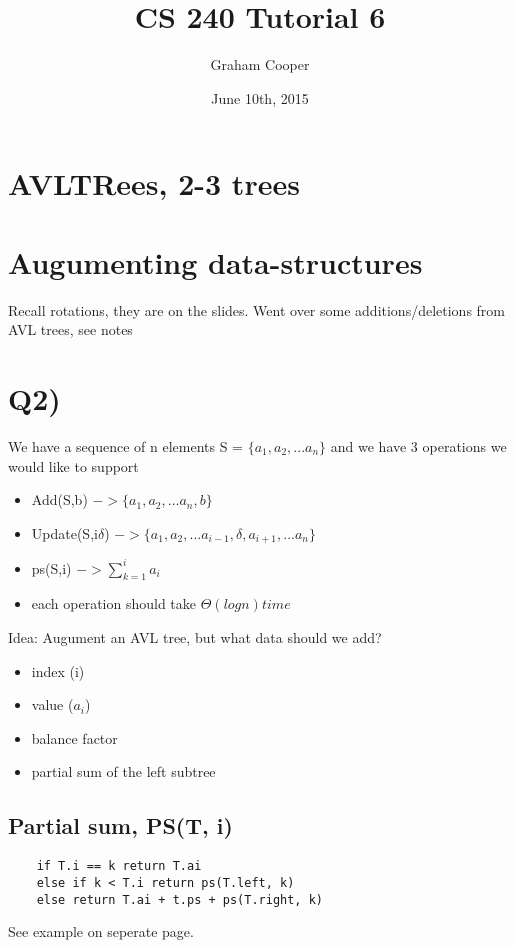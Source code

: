 \documentclass[12pt]{article}
\title{\vspace{-15ex}CS 240 Tutorial 6\vspace{-1ex}}
\date{June 10th, 2015}
\author{Graham Cooper}
\begin{document}
	\maketitle
	\section*{AVLTRees, 2-3 trees}
	\section*{Augumenting data-structures}
	
	Recall rotations, they are on the slides. Went over some additions/deletions from AVL trees, see notes\\
	
	\section*{Q2)}
	We have a sequence of n elements S = $\{a_1, a_2, ... a_n\}$ and we have 3 operations we would like to support\\
	\begin{itemize}
		\item Add(S,b) $-> \{a_1, a_2, ...a_n, b\}$
		\item Update(S,i$\delta$) $-> \{a_1, a_2, ... a_{i-1}, \delta, a_{i+1}, ... a_n\}$
		\item ps(S,i) $-> \sum_{k=1}^{i}a_i$
		\item each operation should take $\Theta(logn) time$
	\end{itemize}
	
	Idea: Augument an AVL tree, but what data should we add?
	\begin{itemize}
		\item index (i)
		\item value ($a_i$)
		\item balance factor
		\item partial sum of the left subtree
	\end{itemize}
	
	\subsection*{Partial sum, PS(T, i)}
	\begin{verbatim}
	if T.i == k return T.ai
	else if k < T.i return ps(T.left, k)
	else return T.ai + t.ps + ps(T.right, k)
	\end{verbatim}
	See example on seperate page.\\
	
\end{document}
